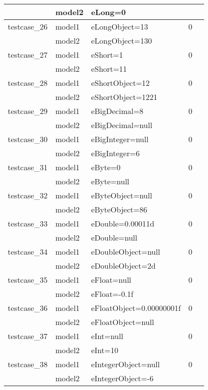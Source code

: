 \documentclass[a4paper]{article}
\begin{document}
\begin{longtable}{|l|l|l|l|l|}
\hline
             & model2 & eLong=0 & &\\
\hline
\hline
testcase\_26 & model1 & eLongObject=13 & 0 &\\
\hline
             & model2 & eLongObject=130 & &\\
\hline
\hline
testcase\_27 & model1 & eShort=1 & 0 &\\
\hline
             & model2 & eShort=11 & &\\
\hline
\hline
testcase\_28 & model1 & eShortObject=12 & 0 &\\
\hline
             & model2 & eShortObject=1221 & &\\
\hline
\hline
testcase\_29 & model1 & eBigDecimal=8 & 0 &\\
\hline
             & model2 & eBigDecimal=null & &\\
\hline
\hline
testcase\_30 & model1 & eBigInteger=null & 0 &\\
\hline
             & model2 & eBigInteger=6 & &\\
\hline
\hline
testcase\_31 & model1 & eByte=0 & 0 &\\
\hline
             & model2 & eByte=null & &\\
\hline
\hline
testcase\_32 & model1 & eByteObject=null & 0 &\\
\hline
             & model2 & eByteObject=86 & &\\
\hline
\hline
testcase\_33 & model1 & eDouble=0.00011d & 0 &\\
\hline
             & model2 & eDouble=null & &\\
\hline
\hline
testcase\_34 & model1 & eDoubleObject=null & 0 &\\
\hline
             & model2 & eDoubleObject=2d & &\\
\hline
\hline
testcase\_35 & model1 & eFloat=null & 0 &\\
\hline
             & model2 & eFloat=-0.1f & &\\
\hline
\hline
testcase\_36 & model1 & eFloatObject=0.00000001f & 0 &\\
\hline
             & model2 & eFloatObject=null & &\\
\hline
\hline
testcase\_37 & model1 & eInt=null & 0 \\
\hline
             & model2 & eInt=10 & &\\
\hline
\hline
testcase\_38 & model1 & eIntegerObject=null & 0 &\\
\hline
             & model2 & eIntegerObject=-6 & &\\
\hline
\hline

\end{longtable}
\end{document}

